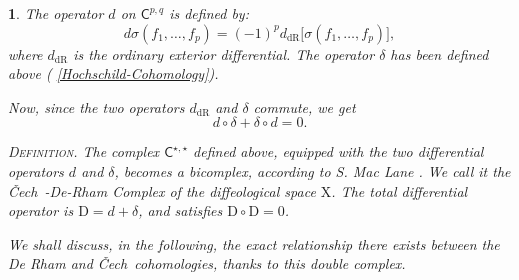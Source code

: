 \documentclass[12pt,reqno]{amsart}
\theoremstyle{article}
\newtheorem{article}{}
\newcommand{\art}[1]{(\text{\textsection} \ref{#1})}
\def \D{\mathrm D}
\def \X{\mathrm X}
\newcommand{\sC}{\mathsf{C}}
\newcommand{\Cech}{\v{C}ech\ }
\newcommand{\dR}{\mathrm{dR}}
\begin{document}
\begin{article}
    The operator $d$ on $\sC^{p,q}$ is defined by:
    $$
    d\sigma(f_1,\dots,f_p) = (-1)^p d_\dR\big[\sigma(f_1,\dots,f_p)\big],
    $$
    where $d_\dR$ is the ordinary exterior differential.
    The operator $\delta$ has been defined above \art{Hochschild-Cohomology}.
    
    Now,
    since the two operators $d_\dR$ and $\delta$ commute,
    we get
    $$
    d \circ \delta + \delta \circ d = 0.
    $$
    
    \textsc{Definition.} \textit{The complex $\sC^{\star,\star}$ defined above,
    equipped with the two differential operators $d$ and $\delta$,
    becomes a \emph{bicomplex},
    according to S. Mac Lane \cite[\textsection XI.6]{Mac67}.
    We call it the \emph{\Cech-De-Rham Complex} of the diffeological space $\X$.
    The total differential operator is $\D =d+\delta$,
    and satisfies $\D \circ \D = 0$.}
    
    We shall discuss,
    in the following,
    the exact relationship there exists between the De Rham and \Cech cohomologies,
    thanks to this double complex.
  \end{article}
  
\end{document}
